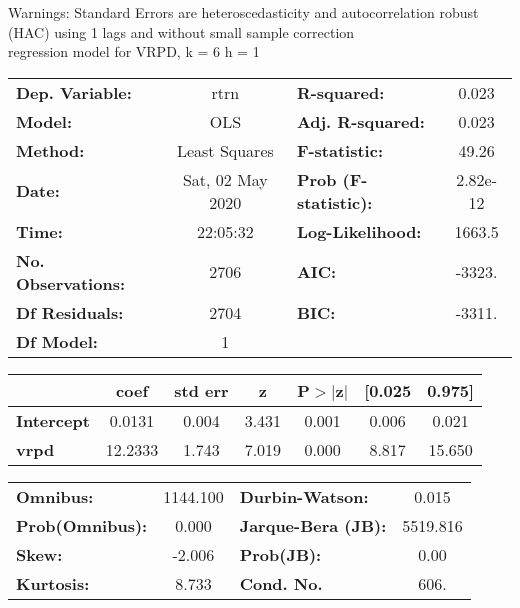 Warnings: \newline
 [1] Standard Errors are heteroscedasticity and autocorrelation robust (HAC) using 1 lags and without small sample correction\\ 

regression model for VRPD, k = 6 h = 1\begin{center}
\begin{tabular}{lclc}
\toprule
\textbf{Dep. Variable:}    &       rtrn       & \textbf{  R-squared:         } &     0.023   \\
\textbf{Model:}            &       OLS        & \textbf{  Adj. R-squared:    } &     0.023   \\
\textbf{Method:}           &  Least Squares   & \textbf{  F-statistic:       } &     49.26   \\
\textbf{Date:}             & Sat, 02 May 2020 & \textbf{  Prob (F-statistic):} &  2.82e-12   \\
\textbf{Time:}             &     22:05:32     & \textbf{  Log-Likelihood:    } &    1663.5   \\
\textbf{No. Observations:} &        2706      & \textbf{  AIC:               } &    -3323.   \\
\textbf{Df Residuals:}     &        2704      & \textbf{  BIC:               } &    -3311.   \\
\textbf{Df Model:}         &           1      & \textbf{                     } &             \\
\bottomrule
\end{tabular}
\begin{tabular}{lcccccc}
                   & \textbf{coef} & \textbf{std err} & \textbf{z} & \textbf{P$> |$z$|$} & \textbf{[0.025} & \textbf{0.975]}  \\
\midrule
\textbf{Intercept} &       0.0131  &        0.004     &     3.431  &         0.001        &        0.006    &        0.021     \\
\textbf{vrpd}      &      12.2333  &        1.743     &     7.019  &         0.000        &        8.817    &       15.650     \\
\bottomrule
\end{tabular}
\begin{tabular}{lclc}
\textbf{Omnibus:}       & 1144.100 & \textbf{  Durbin-Watson:     } &    0.015  \\
\textbf{Prob(Omnibus):} &   0.000  & \textbf{  Jarque-Bera (JB):  } & 5519.816  \\
\textbf{Skew:}          &  -2.006  & \textbf{  Prob(JB):          } &     0.00  \\
\textbf{Kurtosis:}      &   8.733  & \textbf{  Cond. No.          } &     606.  \\
\bottomrule
\end{tabular}
\end{center}

